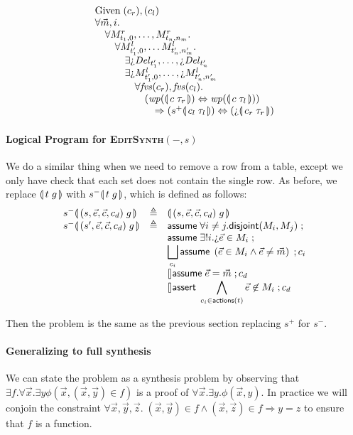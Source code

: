 \[\begin{array}{l}
    \text{Given}\; (c_r), (c_l) \\
    \forall \vec m, i.\\
    \quad \forall M^r_{t_1,0},\ldots,M^r_{t_n,n_m}. \\
    \qquad \forall M^l_{t'_1,0}, \ldots M^l_{t'_n,n'_m}. \\
    \qquad \quad \exists \hole{\mathit{Del}_{t'_1}}, \ldots,
    \hole{\mathit{Del}_{t'_n}} \\
    \qquad \quad \exists \hole{M^l_{t'_1,0}},\ldots, \hole{M^l_{t'_n,n'_m}}\\
    \qquad \qquad \forall \fvs(c_r),\fvs(c_l).\\
    \qquad \qquad \quad (\wp(\parenbb{c\; \tau_r}) \Leftrightarrow \wp(\parenbb{c\; \tau_l})) \\
    \qquad \qquad \qquad \Rightarrow (s^+\parenbb{c_l\; \tau_l}) \Leftrightarrow (\hole\parenbb{c_r\; \tau_r}) \\
  \end{array}\]


\paragraph{Logical Program for \textsc{EditSynth}$(-,s)$}

We do a similar thing when we need to remove a row from a table, except we only
have check that each set does not contain the single row. As before, we replace
$\llparenthesis\, t\;g\, \rrparenthesis$ with $s^-\llparenthesis\, t\; g\, \rrparenthesis$, which is defined as follows:
\[\begin{array}{lcl}
    s^-\parenbb{(s,\vec e, \vec c, c_d) \; g}
    &\triangleq
    & \parenbb{(s,\vec e, \vec c, c_d) \; g} \\
    s^-\parenbb{(s',\vec e, \vec c, c_d) \; g}
    &\triangleq
    & \assume{\forall i\neq j. \mathsf{disjoint}(M_i,M_j)}; \\
    && \assume{\exists! i. \hole{\vec e} \in M_i};\\
    && \displaystyle \Angel_{c_i}
       \assume{\left(\vec e \in M_i\wedge \vec e \neq \vec m \right )}; c_i\\
    && \angel \assume{\vec e = \vec m}; c_d \\
    && \displaystyle \angel \assert{\bigwedge_{c_i \in \actions t} \vec e \not\in M_i}; c_d
\end{array}\]

Then the problem is the same as the previous section replacing $s^+$ for $s^-$.

\paragraph{Generalizing to full synthesis}

We can state the problem as a synthesis problem by observing that
$\exists f. \forall \vec x. \exists y \phi(\vec x, (\vec x,\vec y) \in
f)$ is a proof of $\forall \vec x. \exists y. \phi(\vec x, y)$. In
practice we will conjoin the constraint
$\forall \vec x, \vec y, \vec z.\; (\vec x, \vec y) \in f \wedge (\vec
x, \vec z) \in f \Rightarrow y = z$ to ensure that $f$ is a function.


